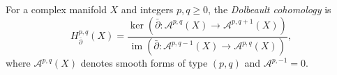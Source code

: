 
For a complex manifold $X$ and integers $p,q\ge0$, the \emph{Dolbeault cohomology} is
\[
H_{\bar\partial}^{p,q}(X)=\frac{\ker(\bar\partial:\mathcal A^{p,q}(X)\to\mathcal A^{p,q+1}(X))}{\operatorname{im}(\bar\partial:\mathcal A^{p,q-1}(X)\to\mathcal A^{p,q}(X))},
\]
where $\mathcal A^{p,q}(X)$ denotes smooth forms of type $(p,q)$ and $\mathcal A^{p,-1}=0$.
